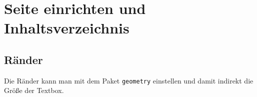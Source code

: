 
\chapter{Seite einrichten und Inhaltsverzeichnis}


\section{Ränder}

Die Ränder kann man mit dem Paket \verb=geometry= einstellen und damit indirekt die Größe der Textbox. 

